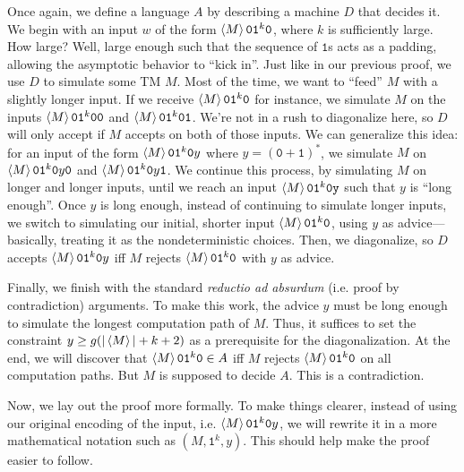 \documentclass[11pt,twoside=off,numbers=noenddot]{scrbook}
\begin{document}
\begin{proofidea}
  Once again, we define a language $A$ by describing a machine $D$ that decides it. We begin with an input $w$ of the form $\left< M \right>\texttt{0}\texttt{1}^k\texttt{0}$, where $k$ is sufficiently large. How large? Well, large enough such that the sequence of $\texttt{1}$s acts as a padding, allowing the asymptotic behavior to ``kick in''. Just like in our previous proof, we use $D$ to simulate some TM $M$. Most of the time, we want to ``feed'' $M$ with a slightly longer input. If we receive $\left< M \right>\texttt{0}\texttt{1}^k\texttt{0}$ for instance, we simulate $M$ on the inputs $\left< M \right>\texttt{0}\texttt{1}^{k}\texttt{0}\texttt{0}$ and $\left< M \right>\texttt{0}\texttt{1}^{k}\texttt{0}\texttt{1}$. We're not in a rush to diagonalize here, so $D$ will only accept if $M$ accepts on both of those inputs. We can generalize this idea: for an input of the form $\left< M \right>\texttt{0}\texttt{1}^{k}\texttt{0}y$ where $y = (\texttt{0} + \texttt{1})^\ast$, we simulate $M$ on $\left< M \right>\texttt{0}\texttt{1}^{k}\texttt{0}y\texttt{0}$ and $\left< M \right>\texttt{0}\texttt{1}^{k}\texttt{0}y\texttt{1}$. We continue this process, by simulating $M$ on longer and longer inputs, until we reach an input $\left< M \right>\texttt{0}\texttt{1}^k\texttt{0}\texttt{y}$ such that $y$ is ``long enough''. Once $y$ is long enough, instead of continuing to simulate longer inputs, we switch to simulating our initial, shorter input $\left< M \right>\texttt{0}\texttt{1}^k\texttt{0}$, using $y$ as advice—basically, treating it as the nondeterministic choices. Then, we diagonalize, so $D$ accepts $\left< M \right>\texttt{0}\texttt{1}^k\texttt{0}y$ iff $M$ rejects $\left< M \right>\texttt{0}\texttt{1}^k\texttt{0}$ with $y$ as advice.

  Finally, we finish with the standard \textit{reductio ad absurdum} (i.e. proof by contradiction) arguments. To make this work, the advice $y$ must be long enough to simulate the longest computation path of $M$. Thus, it suffices to set the constraint $y \geq g(| \left< M \right> | + k + 2)$ as a prerequisite for the diagonalization. At the end, we will discover that $\left< M \right>\texttt{0}\texttt{1}^k\texttt{0} \in A$ iff $M$ rejects $\left< M \right>\texttt{0}\texttt{1}^k\texttt{0}$ on all computation paths. But $M$ is supposed to decide $A$. This is a contradiction.
\end{proofidea}

Now, we lay out the proof more formally. To make things clearer, instead of using our original encoding of the input, i.e. $\left< M \right>\texttt{0}\texttt{1}^k\texttt{0}y$, we will rewrite it in a more mathematical notation such as $(M, \texttt{1}^k, y)$. This should help make the proof easier to follow.
\end{document}
